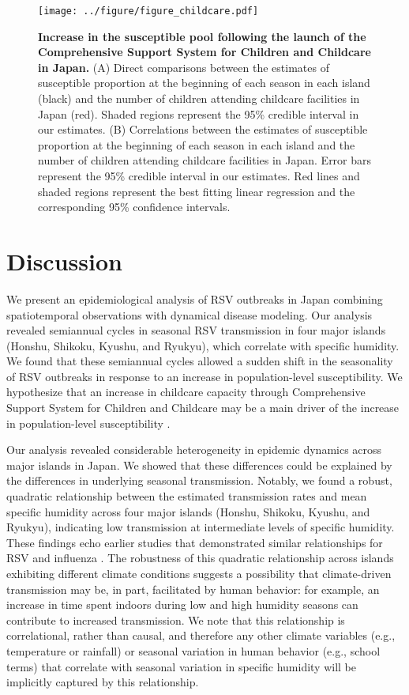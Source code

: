 \documentclass[12pt]{article}
\begin{document}
\begin{figure}[!th]
\texttt{[image: ../figure/figure\_childcare.pdf]}
\caption{
\textbf{Increase in the susceptible pool following the launch of the Comprehensive Support System for Children and Childcare in Japan.}
(A) Direct comparisons between the estimates of susceptible proportion at the beginning of each season in each island (black) and the number of children attending childcare facilities in Japan (red).
Shaded regions represent the 95\% credible interval in our estimates.
(B) Correlations between the estimates of susceptible proportion at the beginning of each season in each island and the number of children attending childcare facilities in Japan.
Error bars represent  the 95\% credible interval in our estimates.
Red lines and shaded regions represent the best fitting linear regression and the corresponding 95\% confidence intervals.
}
\label{fig:fig4}
\end{figure}

\section*{Discussion}

We present an epidemiological analysis of RSV outbreaks in Japan combining spatiotemporal observations with dynamical disease modeling.
Our analysis revealed semiannual cycles in seasonal RSV transmission in four major islands (Honshu, Shikoku, Kyushu, and Ryukyu), which correlate with specific humidity.
We found that these semiannual cycles allowed a sudden shift in the seasonality of RSV outbreaks in response to an increase in population-level susceptibility.
We hypothesize that an increase in childcare capacity through Comprehensive Support System for Children and Childcare may be a main driver of the increase in population-level susceptibility \citep{dehaan2024age}.

Our analysis revealed considerable heterogeneity in epidemic dynamics across major islands in Japan.
We showed that these differences could be explained by the differences in underlying seasonal transmission.
Notably, we found a robust, quadratic relationship between the estimated transmission rates and mean specific humidity across four major islands (Honshu, Shikoku, Kyushu, and Ryukyu), indicating low transmission at intermediate levels of specific humidity.
These findings echo earlier studies that demonstrated similar relationships for RSV \citep{baker2019epidemic} and influenza \citep{lowen2007influenza,shaman2009absolute,shaman2010absolute,tamerius2013environmental,lowen2014roles}.
The robustness of this quadratic relationship across islands exhibiting different climate conditions suggests a possibility that climate-driven transmission may be, in part, facilitated by human behavior: for example, an increase in time spent indoors during low and high humidity seasons can contribute to increased transmission.
We note that this relationship is correlational, rather than causal, and therefore any other climate variables (e.g., temperature or rainfall) or seasonal variation in human behavior (e.g., school terms) that correlate with seasonal variation in specific humidity will be implicitly captured by this relationship.
\end{document}
